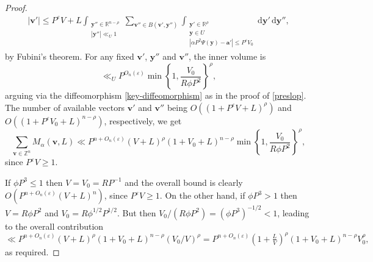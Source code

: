 \documentclass[a4paper,11pt, twoside,reqno]{amsart}
\theoremstyle{plain}
\theoremstyle{definition}
\theoremstyle{remark}
\newcommand{\ZZ}{\mathbb{Z}}
\newcommand{\RR}{\mathbb{R}}
\newcommand{\dd}{\mathrm{d}}
\newcommand{\ve}{\varepsilon}
\renewcommand{\le}{\leqslant}
\renewcommand{\leq}{\leqslant}
\renewcommand{\ge}{\geqslant}
\numberwithin{equation}{section}
\begin{document}
\begin{proof}
\begin{equation*}
\begin{split}
{{|\bm{v}'|\le P^\ve V + L}}
\int_{\substack{\bm{y}''\in \RR^{n-\rho}\\ |\bm{y}''|\ll_U 1}}
\sum_{\bm{v}''\in B(\bm{v}',\bm{y}'')}
\int_{\substack{\bm{y}'\in \RR^\rho\\ \bm{y}\in U\\
|\alpha P^2\Psi(\bm{y})-\bm{a}'|\leq P^\varepsilon V_0}}
\dd\bm{y}'\, \dd\bm{y}'',
\end{split}
\end{equation*}
by Fubini's theorem.
For any fixed $\bm{v}'$, $\bm{y}''$ and $\bm{v}''$, the inner volume is 
$$
\ll_U P^{O_n(\ve)} \min\left\{1, \frac{ V_0}{R\phi P^2}\right\}^\rho,
$$
arguing via the diffeomorphism \eqref{key-diffeomorphism}
as in the proof of \eqref{preslop}.
The number of available vectors $\bm{v}'$ and $\bm{v}''$
being $O((1+P^\ve V + L)^\rho)$ and $O((1+P^\ve V_0 + L)^{n-\rho})$, respectively, we get
\begin{equation*}
\sum_{\bm{v}\in \ZZ^n}
M_\alpha(\bm{v},L)
\ll P^{n+O_n(\ve)} (V + L)^\rho (1+V_0+L)^{n-\rho}
\min\left\{1, \frac{ V_0}{R\phi P^2}\right\}^\rho,
\end{equation*}
since $P^\ve V\ge 1$.

If $\phi P^3\leq 1$ then $V=V_0=RP^{-1}$ and the overall bound is clearly
$O(P^{n+O_n(\ve)} (V+L)^n)$,
since $P^\ve V\ge 1$.
On the other hand, if 
 $\phi P^3>1$ then $V=R\phi P^2$ and
 $V_0=R\phi^{1/2}P^{1/2}$. But then
 $V_0/(R\phi P^2)=(\phi P^3)^{-1/2}< 1$, leading to the overall  contribution
$$
\ll P^{n+O_n(\ve)} (V+L)^\rho (1+V_0+L)^{n-\rho} (V_0/V)^\rho
= P^{n+O_n(\ve)} (1+\tfrac{L}{V})^\rho (1+V_0+L)^{n-\rho} V_0^\rho,
$$ 
as required.
\end{proof}
\end{document}
